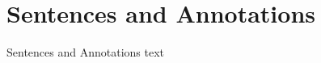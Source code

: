 

\section{Sentences and Annotations}\fbeg{}\begin{frame}{}

{\fontsize{20}{23}\selectfont

Sentences and Annotations text

}

\end{frame}


